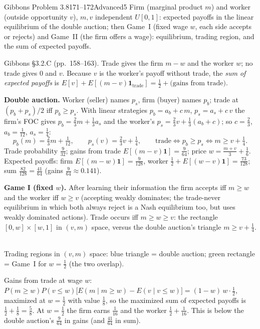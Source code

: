 \begin{exsol}{Gibbons Problem 3.8}{171--172}{Advanced}{5}
\asked Firm (marginal product $m$) and worker (outside opportunity $v$), $m,v$ independent $U[0,1]$:
expected payoffs in the linear equilibrium of the double auction; then Game~I (fixed wage $w$, each side
accepts or rejects) and Game~II (the firm offers a wage): equilibrium, trading region, and the
sum of expected payoffs.

\method Gibbons \S3.2.C (pp.~158--163). Trade gives the firm $m-w$ and the worker $w$; no
trade gives $0$ and $v$. Because $v$ is the worker's payoff without trade, the \emph{sum of
expected payoffs} is $E[v]+E[(m-v)\mathbf 1_{\text{trade}}]=\tfrac12+\text{(gains from trade)}$.

\solution
\textbf{Double auction.} Worker (seller) names $p_s$, firm (buyer) names $p_b$; trade at
$(p_b+p_s)/2$ iff $p_b\ge p_s$. With linear strategies $p_b=a_b+c\,m$, $p_s=a_s+c\,v$ the firm's
FOC gives $p_b=\tfrac23m+\tfrac13a_s$ and the worker's $p_s=\tfrac23v+\tfrac13(a_b+c)$; so
$c=\tfrac23$, $a_b=\tfrac1{12}$, $a_s=\tfrac14$:
\[
  p_b(m)=\tfrac23m+\tfrac1{12},\qquad p_s(v)=\tfrac23v+\tfrac14,\qquad
  \text{trade}\iff p_b\ge p_s\iff m\ge v+\tfrac14 .
\]
Trade probability $\tfrac9{32}$; gains from trade $E[(m-v)\mathbf 1]=\tfrac9{64}$; price
$w=\tfrac{m+v}3+\tfrac16$. Expected payoffs: firm $E[(m-w)\mathbf 1]=\tfrac9{128}$, worker
$\tfrac12+E[(w-v)\mathbf 1]=\tfrac{73}{128}$; sum $\tfrac{82}{128}=\tfrac{41}{64}$ (gains $\tfrac9{64}\approx0.141$).

\textbf{Game I (fixed $w$).} After learning their information the firm accepts iff $m\ge w$ and the worker
iff $w\ge v$ (accepting weakly dominates; the trade-never equilibrium in which both always reject is
a Nash equilibrium too, but uses weakly dominated actions). Trade occurs iff $m\ge w\ge v$: the
rectangle $[0,w]\times[w,1]$ in $(v,m)$ space, versus the double auction's triangle $m\ge v+\tfrac14$.
\begin{center}
\\[-2pt]
{\footnotesize Trading regions in $(v,m)$ space: blue triangle = double auction; green rectangle = Game~I
for $w=\tfrac12$ (the two overlap).}
\end{center}
Gains from trade at wage $w$: $P(m\ge w)P(v\le w)\bigl[E(m\mid m\ge w)-E(v\mid v\le w)\bigr]=(1-w)\,w\cdot\tfrac12$,
maximized at $w=\tfrac12$ with value $\tfrac18$, so the maximized sum of expected payoffs is
$\tfrac12+\tfrac18=\tfrac58$. At $w=\tfrac12$ the firm earns $\tfrac1{16}$ and the worker $\tfrac12+\tfrac1{16}$. This
is below the double auction's $\tfrac9{64}$ in gains (and $\tfrac{41}{64}$ in sum).


\end{exsol}
